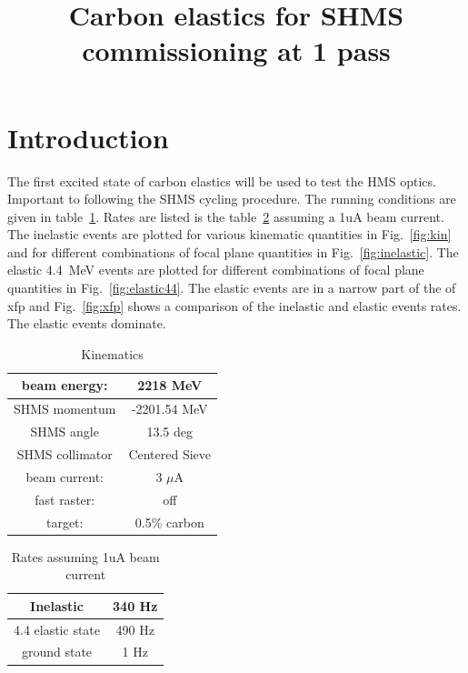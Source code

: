 \documentclass[]{article}
\title{Carbon elastics for SHMS commissioning at 1 pass}
\begin{document}
\maketitle


\section{Introduction}

The first excited state of carbon elastics will be used to test the HMS optics.
Important to following the SHMS cycling procedure.
The running conditions are given in table~\ref{tab:kin}.
Rates are listed is the table~\ref{tab:rates} assuming a 1uA beam current.
The inelastic events are plotted for various kinematic quantities in Fig.~\ref{fig:kin}
and for different combinations of focal plane quantities in Fig.~\ref{fig:inelastic}.
The elastic 4.4~MeV events are plotted for different combinations
 of focal plane quantities in Fig.~\ref{fig:elastic44}. The elastic events are in a narrow part of the 
 of xfp and Fig.~\ref{fig:xfp} shows a comparison of the inelastic and elastic events rates.
 The elastic events dominate.

\begin{table}[h]
	\begin{center}
		\begin{tabular}[]{|c|c|} \hline\hline
			beam energy: & 2218 MeV\\ \hline
			SHMS momentum & -2201.54 MeV \\ \hline
			SHMS angle & 13.5 deg \\ \hline
			SHMS collimator & Centered Sieve \\ \hline
			beam current: & 3 $\mu$A\\ \hline
			fast raster: & off\\ \hline
			target: & 0.5\% carbon\\ \hline
		\end{tabular}
		\caption{Kinematics}
		\label{tab:kin}
	\end{center}
\end{table}
\begin{table}[h]
	\begin{center}
		\begin{tabular}[]{|c|c|} \hline\hline
			Inelastic & 340 Hz\\ \hline
			4.4 elastic state &  490 Hz\\ \hline
			ground state & 1 Hz \\ \hline
		\end{tabular}
		\caption{Rates assuming 1uA beam current}
\label{tab:rates}
	\end{center}
\end{table}
\end{document}
